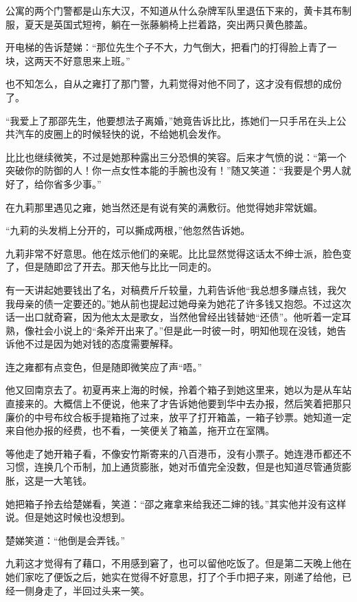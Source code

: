 \par 公寓的两个门警都是山东大汉，不知道从什么杂牌军队里退伍下来的，黄卡其布制服，夏天是英国式短袴，躺在一张藤躺椅上拦着路，突出两只黄色膝盖。
\par 开电梯的告诉楚娣：“那位先生个子不大，力气倒大，把看门的打得脸上青了一块，这两天不好意思来上班。”
\par 也不知怎么，自从之雍打了那门警，九莉觉得对他不同了，这才没有假想的成份了。
\par “我爱上了那邵先生，他要想法子离婚，”她竟告诉比比，拣她们一只手吊在头上公共汽车的皮圈上的时候轻快的说，不给她机会发作。
\par 比比也继续微笑，不过是她那种露出三分恐惧的笑容。后来才气愤的说：“第一个突破你的防御的人！你一点女性本能的手腕也没有！”随又笑道：“我要是个男人就好了，给你省多少事。”
\par 在九莉那里遇见之雍，她当然还是有说有笑的满敷衍。他觉得她非常妩媚。
\par “九莉的头发梢上分开的，可以撕成两根，”他忽然告诉她。
\par 九莉非常不好意思。他在炫示他们的亲昵。比比显然觉得这话太不绅士派，脸色变了，但是随即岔了开去。那天他与比比一同走的。
\par 有一天讲起她要钱出了名，对稿费斤斤较量，九莉告诉他“我总想多赚点钱，我欠我母亲的债一定要还的。”她从前也提起过她母亲为她花了许多钱又抱怨。不过这次话一出口就奇窘，因为他太太是歌女，当然他曾经出钱替她“还债”。他听着一定耳熟，像社会小说上的“条斧开出来了。”但是此一时彼一时，明知他现在没钱，她告诉他不过是因为她对钱的态度需要解释。
\par 连之雍都有点变色，但是随即微笑应了声“唔。”
\par 他又回南京去了。初夏再来上海的时候，拎着个箱子到她这里来，她以为是从车站直接来的。大概信上不便说，他来了才告诉她他要到华中去办报，然后笑着把那只廉价的中号布纹合板手提箱拖了过来，放平了打开箱盖，一箱子钞票。她知道一定来自他办报的经费，也不看，一笑便关了箱盖，拖开立在室隅。
\par 等他走了她开箱子看，不像安竹斯寄来的八百港币，没有小票子。她连港币都还不习惯，连换几个币制，加上通货膨胀，她对币值完全没数，但是也知道尽管通货膨胀，这是一大笔钱。
\par 她把箱子拎去给楚娣看，笑道：“邵之雍拿来给我还二婶的钱。”其实他并没有这样说。但是她这时候也没想到。
\par 楚娣笑道：“他倒是会弄钱。”
\par 九莉这才觉得有了藉口，不用感到窘了，也可以留他吃饭了。但是第二天晚上他在她们家吃了便饭之后，她实在觉得不好意思，打了个手巾把子来，刚递了给他，已经一侧身走了，半回过头来一笑。
